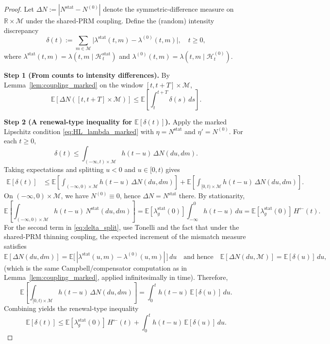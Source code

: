 \documentclass[12pt]{article}
\begin{document}
\begin{proof}
Let $\Delta N:=|N^{\mathrm{stat}}-N^{(0)}|$ denote the symmetric-difference measure on $\mathbb R\times\mathcal M$ under the shared-PRM coupling.
Define the (random) intensity discrepancy
\[
\delta(t):=\sum_{m\in\mathcal M}\bigl|\lambda^{\mathrm{stat}}(t,m)-\lambda^{(0)}(t,m)\bigr|,
\quad t\ge 0,
\]
where $\lambda^{\mathrm{stat}}(t,m)=\lambda(t,m\mid \mathcal H^{\mathrm{stat}}_t)$ and $\lambda^{(0)}(t,m)=\lambda(t,m\mid \mathcal H^{(0)}_t)$.

\textbf{Step 1 (From counts to intensity differences).}
By Lemma~\ref{lem:coupling_marked} on the window $[t,t+T]\times\mathcal M$,
\begin{equation}
\label{eq:mix_step_counts_to_delta}
\mathbb E[\Delta N([t,t+T]\times\mathcal M)]
\le
\mathbb E\!\left[\int_t^{t+T} \delta(s)\,ds\right].
\end{equation}

\textbf{Step 2 (A renewal-type inequality for $\mathbb E[\delta(t)]$).}
Apply the marked Lipschitz condition \eqref{eq:HL_lambda_marked} with $\eta=N^{\mathrm{stat}}$ and $\eta'=N^{(0)}$.
For each $t\ge 0$,
\[
\delta(t)\le \int_{(-\infty,t)\times\mathcal M} h(t-u)\,\Delta N(du,dm).
\]
Taking expectations and splitting $u<0$ and $u\in[0,t)$ gives
\begin{align}
\mathbb E[\delta(t)]
&\le
\mathbb E\!\left[\int_{(-\infty,0)\times\mathcal M} h(t-u)\,\Delta N(du,dm)\right]
+
\mathbb E\!\left[\int_{[0,t)\times\mathcal M} h(t-u)\,\Delta N(du,dm)\right]. \label{eq:delta_split}
\end{align}
On $(-\infty,0)\times\mathcal M$, we have $N^{(0)}\equiv 0$, hence $\Delta N=N^{\mathrm{stat}}$ there. By stationarity,
\[
\mathbb E\!\left[\int_{(-\infty,0)\times\mathcal M} h(t-u)\,N^{\mathrm{stat}}(du,dm)\right]
=
\mathbb E[\lambda_g^{\mathrm{stat}}(0)]\int_{-\infty}^0 h(t-u)\,du
=
\mathbb E[\lambda_g^{\mathrm{stat}}(0)]\,H^\leftarrow(t).
\]
For the second term in \eqref{eq:delta_split}, use Tonelli and the fact that under the shared-PRM thinning coupling,
the expected increment of the mismatch measure satisfies
\[
\mathbb E[\Delta N(du,dm)] = \mathbb E\bigl[\,|\lambda^{\mathrm{stat}}(u,m)-\lambda^{(0)}(u,m)|\,\bigr]\,du
\quad\text{and hence}\quad
\mathbb E[\Delta N(du,\mathcal M)] = \mathbb E[\delta(u)]\,du,
\]
(which is the same Campbell/compensator computation as in Lemma~\ref{lem:coupling_marked}, applied infinitesimally in time).
Therefore,
\[
\mathbb E\!\left[\int_{[0,t)\times\mathcal M} h(t-u)\,\Delta N(du,dm)\right]
=
\int_0^t h(t-u)\,\mathbb E[\delta(u)]\,du.
\]
Combining yields the renewal-type inequality
\begin{equation}
\label{eq:renewal_delta}
\mathbb E[\delta(t)]
\le
\mathbb E[\lambda_g^{\mathrm{stat}}(0)]\,H^\leftarrow(t)
+
\int_0^t h(t-u)\,\mathbb E[\delta(u)]\,du.
\end{equation}


\end{proof}
\end{document}
